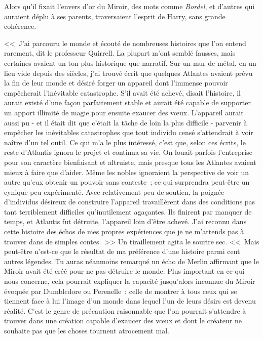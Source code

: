 Alors qu'il fixait l'envers d'or du Miroir, des mots comme \emph{Bordel}, et d'autres qui auraient déplu à ses parents, traversaient l'esprit de Harry, sans grande cohérence.

<<~J'ai parcouru le monde et écouté de nombreuses histoires que l'on entend rarement, dit le professeur Quirrell. La plupart m'ont semblé fausses, mais certaines avaient un ton plus historique que narratif. Sur un mur de métal, en un lieu vide depuis des siècles, j'ai trouvé écrit que quelques Atlantes avaient prévu la fin de leur monde et désiré forger un appareil dont l'immense pouvoir empêcherait l'inévitable catastrophe. S'il avait été achevé, disait l'histoire, il aurait existé d'une façon parfaitement stable et aurait été capable de supporter un apport illimité de magie pour ensuite exaucer des vœux. L'appareil aurait aussi pu - et il était dit que c'était la tâche de loin la plus difficile - parvenir à empêcher les inévitables catastrophes que tout individu censé s'attendrait à voir naître d'un tel outil. Ce qui m'a le plus intéressé, c'est que, selon ces écrits, le reste d'Atlantis ignora le projet et continua sa vie. On louait parfois l'entreprise pour son caractère bienfaisant et altruiste, mais presque tous les Atlantes avaient mieux à faire que d'aider. Même les nobles ignoraient la perspective de voir un autre qu'eux obtenir un pouvoir sans conteste~; ce qui surprendra peut-être un cynique peu expérimenté. Avec relativement peu de soutien, la poignée d'individus désireux de construire l'appareil travaillèrent dans des conditions pas tant terriblement difficiles qu'inutilement agaçantes. Ils finirent par manquer de temps, et Atlantis fut détruite, l'appareil loin d'être achevé. J'ai reconnu dans cette histoire des échos de mes propres expériences que je ne m'attends pas à trouver dans de simples contes.~>> Un tiraillement agita le sourire sec. <<~Mais peut-être n'est-ce que le résultat de ma préférence d'une histoire parmi cent autres légendes. Tu auras néanmoins remarqué un écho de Merlin affirmant que le Miroir avait été créé pour ne pas détruire le monde. Plus important en ce qui nous concerne, cela pourrait expliquer la capacité jusqu'alors inconnue du Miroir évoquée par Dumbledore ou Perenelle~: celle de montrer à tous ceux qui se tiennent face à lui l'image d'un monde dans lequel l'un de leurs désirs est devenu réalité. C'est le genre de précaution raisonnable que l'on pourrait s'attendre à trouver dans une création capable d'exaucer des vœux et dont le créateur ne souhaite pas que les choses tournent atrocement mal.

